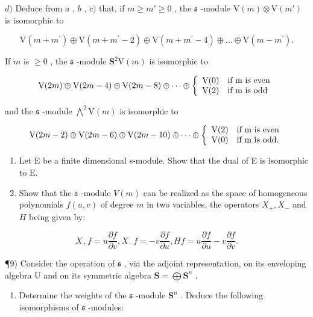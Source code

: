 \(d)\) Deduce from \(a\) , \(b\) , \(c)\) that, if \(m \geq m' \geq 0\) , the \(\mathfrak{s}\) -module \(\mathrm{V}(m) \otimes \mathrm{V}(m')\) is isomorphic to

\[
\mathrm{V} (m + m ^ {\prime}) \oplus \mathrm{V} (m + m ^ {\prime} - 2) \oplus \mathrm{V} (m + m ^ {\prime} - 4) \oplus \dots \oplus \mathrm{V} (m - m ^ {\prime}).
\]

If \(m\) is \(\geq 0\) , the \(\mathfrak{s}\) -module \(\mathbf{S}^2\mathrm{V}(m)\) is isomorphic to

\[
\mathrm{V} (2 m) \oplus \mathrm{V} (2 m - 4) \oplus \mathrm{V} (2 m - 8) \oplus \dots \oplus \left\{ \begin{array}{l l} \mathrm{V} (0) & \text {if m is even} \\ \mathrm{V} (2) & \text {if m is odd} \end{array} \right.
\]

and the \(\mathfrak{s}\) -module \(\bigwedge^2\mathrm{V}(m)\) is isomorphic to

\[
\mathrm{V} (2 m - 2) \oplus \mathrm{V} (2 m - 6) \oplus \mathrm{V} (2 m - 10) \oplus \dots \oplus \left\{ \begin{array}{l l} \mathrm{V} (2) & \text {if m is even} \\ \mathrm{V} (0) & \text {if m is odd.} \end{array} \right.
\]

\begin{enumerate}
\def\labelenumi{\arabic{enumi})}
\setcounter{enumi}{6}
\item
  Let E be a finite dimensional s-module. Show that the dual of E is isomorphic to E.
\item
  Show that the \(\mathfrak{s}\) -module \(V(m)\) can be realized as the space of homogeneous polynomials \(f(u,v)\) of degree \(m\) in two variables, the operators \(X_{+}, X_{-}\) and \(H\) being given by:
\end{enumerate}

\[
X _ {+} f = u \frac {\partial f}{\partial v}, X _ {-} f = - v \frac {\partial f}{\partial u}, H f = u \frac {\partial f}{\partial u} - v \frac {\partial f}{\partial v}.
\]

¶9) Consider the operation of \(\mathfrak{s}\) , via the adjoint representation, on its enveloping algebra U and on its symmetric algebra \(\mathbf{S} = \bigoplus \mathbf{S}^n\) .

\begin{enumerate}
\def\labelenumi{\alph{enumi})}
\tightlist
\item
  Determine the weights of the \(\mathfrak{s}\) -module \(\mathbf{S}^n\) . Deduce the following isomorphisms of \(\mathfrak{s}\) -modules:
\end{enumerate}


